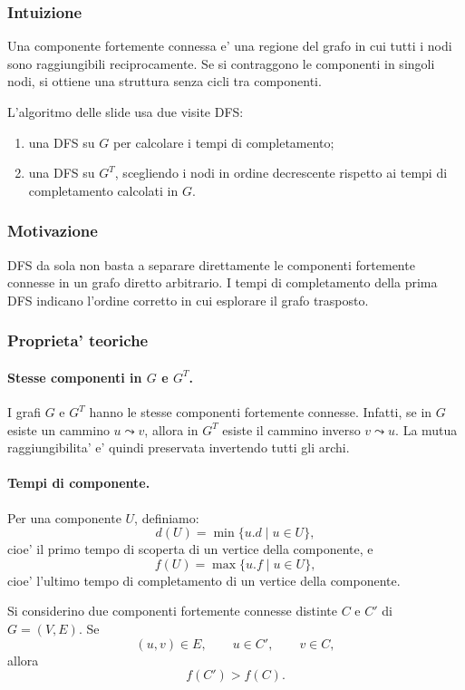 \subsubsection{Intuizione}
Una componente fortemente connessa e' una regione del grafo in cui tutti i nodi sono raggiungibili reciprocamente. Se si contraggono le componenti in singoli nodi, si ottiene una struttura senza cicli tra componenti.

L'algoritmo delle slide usa due visite DFS:
\begin{enumerate}
	\item una DFS su $G$ per calcolare i tempi di completamento;
	\item una DFS su $G^T$, scegliendo i nodi in ordine decrescente rispetto ai tempi di completamento calcolati in $G$.
\end{enumerate}

\subsubsection{Motivazione}
DFS da sola non basta a separare direttamente le componenti fortemente connesse in un grafo diretto arbitrario. I tempi di completamento della prima DFS indicano l'ordine corretto in cui esplorare il grafo trasposto.

\subsubsection{Proprieta' teoriche}
\paragraph{Stesse componenti in $G$ e $G^T$.}
I grafi $G$ e $G^T$ hanno le stesse componenti fortemente connesse. Infatti, se in $G$ esiste un cammino $u\leadsto v$, allora in $G^T$ esiste il cammino inverso $v\leadsto u$. La mutua raggiungibilita' e' quindi preservata invertendo tutti gli archi.

\paragraph{Tempi di componente.}
Per una componente $U$, definiamo:
\[
d(U)=\min\{u.d\mid u\in U\},
\]
cioe' il primo tempo di scoperta di un vertice della componente, e
\[
f(U)=\max\{u.f\mid u\in U\},
\]
cioe' l'ultimo tempo di completamento di un vertice della componente.

\begin{lemma}
Si considerino due componenti fortemente connesse distinte $C$ e $C'$ di $G=(V,E)$. Se
\[
(u,v)\in E,\qquad u\in C',\qquad v\in C,
\]
allora
\[
f(C')>f(C).
\]
\end{lemma}


